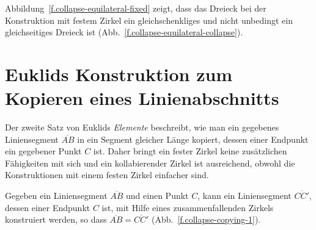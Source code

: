 Abbildung~\ref{f.collapse-equilateral-fixed} zeigt, dass das Dreieck bei der Konstruktion mit festem Zirkel ein gleichschenkliges und nicht unbedingt ein gleichseitiges Dreieck ist  (Abb.~\ref{f.collapse-equilateral-collapse}).

\section{Euklids Konstruktion zum Kopieren eines Linienabschnitts}\label{s.collapse-copy}

Der zweite Satz von Euklids \textit{Elemente} beschreibt, wie man ein gegebenes Liniensegment $\overline{AB}$ in ein Segment gleicher Länge kopiert, dessen einer Endpunkt ein gegebener Punkt $C$ ist. Daher bringt ein fester Zirkel keine zusätzlichen Fähigkeiten mit sich und ein kollabierender Zirkel ist ausreichend, obwohl die Konstruktionen mit einem festen Zirkel einfacher sind.

\begin{theorem}
Gegeben ein Liniensegment $\overline{AB}$ und einen Punkt $C$, kann ein Liniensegment $\overline{CC'}$, dessen einer Endpunkt $C$ ist, mit Hilfe eines zusammenfallenden Zirkels konstruiert werden, so dass $\overline{AB}=\overline{CC'}$ (Abb.~\ref{f.collapse-copying-1}).
\end{theorem}

